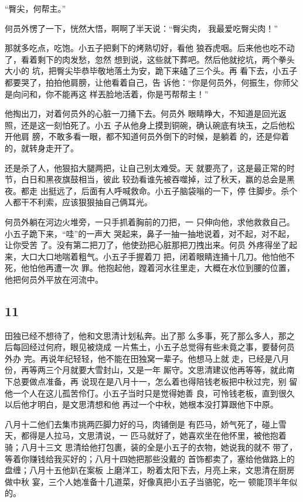 “臀尖，何帮主。”

何员外愣了一下，恍然大悟，啊啊了半天说：“臀尖肉，
我最爱吃臀尖肉！”

那就多吃点，吃饱。小五子把剩下的烤熟切好，看他
狼吞虎咽。后来他也吃不动了，看着剩下的肉发愁，忽然
想到说，这些就下葬吧。然后他就挖坑，两个拳头大小的
坑，把臀尖毕恭毕敬地落土为安，跪下来磕了三个头。再
看下去，小五子都要哭了，拍拍他肩膀，让他看着自己，告
诉他：“你是何员外，何振生，你师父是向问和，你不能再这
样丟脸地活着，你是丐帮帮主！”

他掏出刀，对着何员外的心脏一刀捅下去。何员外
眼睛睁大，不知道是回光返照，还是这一刻怕死了。小五
子从他身上摸到铜碗，确认碗底有块玉，之后他松开他肩
膀，不敢多看一眼，都不知道何员外倒下的时候，是躺着
的，还是仰着的，就转身走开了。

还是杀了人，他狠掐大腿两把，让自己别太难受。天
就要亮了，这是最正常的时节，白日和黑夜旗鼓相当，彼此
较劲看谁先被吞噬掉，过了秋天，赢的总会是黑夜。都走
出挺远了，后面有人呼喊救命。小五子脑袋嗡的一下，停
住脚步。杀个人都干不利索，应该狠狠抽自己俩耳光。

何员外躺在河边火堆旁，一只手抓着胸前的刀把，一
只伸向他，求他救救自己。小五子跪下来，“哇”的一声大
哭起来，鼻子一抽一抽地说着，对不起，对不起，让你受苦
了。没有第二把刀了，他使劲把心脏那把刀拽出来。何员
外疼得坐了起来，大口大口地喘着粗气。小五子手握着刀
把，闭着眼睛连捅十几刀。他怕他不死，他怕他再遭一次
罪。他抱起他，蹚着河水往里走，大概在水位到腰的位置，
他把何员外平放在河流中。
\newline

{\centering\subsection{11}}

田独已经不想待了，他和文思清计划私奔。出了那
么多事，死了那么多人，那之后每回经过何府，眼见被烧成
一片焦土，小五子总觉得有些未竟之事，要替何员外办
完。再说年纪轻轻，他不能在田独窝一辈子。他想马上就
走，已经是八月份，再等两三个月就要大雪封山，又是一年
厮守。文思清建议他再等等，就此南下总要做点准备，再
说现在是八月十一，怎么着也得陪钱老板把中秋过完，别
留他一个人在这儿孤苦伶仃。小五子当时只是觉得她善
良，可怜钱老板，直到很久以后他才明白，是文思清想和他
再过一个中秋，她根本没打算跟他下中原。

八月十二他们去集市挑两匹脚力好的马，肉铺倒是
有匹马，娇气死了，碰上雪天，都得是人拉马，文思清说，一
匹马就好了，她喜欢坐在他怀里，被他抱着骑；八月十三文
思清给他打包裹，装的全是小五子的衣物，她说我的就不
带了，等着你赚钱给我买好的；八月十四她把那些没戴的
首饰都卖了，塞给他做路上的盘缠；八月十五他趴在案板
上磨洋工，盼着太阳下去，月亮上来，文思清在厨房做中秋
宴，三个人她准备十几道菜，好像真把小五子当骆驼，吃一
顿能顶半年似的。

